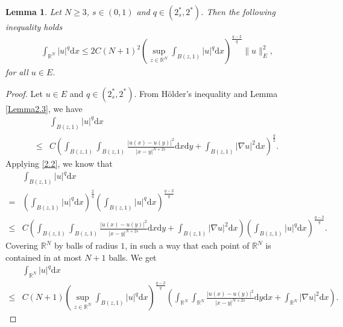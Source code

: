 \documentclass[12pt,a4paper,reqno]{amsart}
\numberwithin{equation}{section}
\newtheorem{lemma}{Lemma}[section]
\begin{document}
\begin{lemma}\label{Lemma2.4}
Let $N\geqslant 3$, $s\in(0,1)$ and $q\in(2^{*}_{s},2^{*})$. Then the following inequality holds
\begin{equation*}
\begin{aligned}
\int_{\mathbb{R}^{N}}|u|^{q}\mathrm{d}x\leqslant2C(N+1)^{2}
\left(\sup_{z\in \mathbb{R}^{N}}
\int_{B(z,1)}
|u|^{q}
\mathrm{d}x\right)^{\frac{q-2}{q}}
\|u\|_{E}^{2},
\end{aligned}
\end{equation*}
for all $u\in E$.
\end{lemma}

\begin{proof}
Let $u\in E$ and $q\in(2_{s}^{*},2^{*})$.
From H\"{o}lder's inequality and Lemma \ref{Lemma2.3}, we have
\begin{equation}\label{2.2}
\begin{aligned}
&\int_{B(z,1)}|u|^{q}\mathrm{d}x\\
\leqslant&
C
\left(
\int_{B(z,1)}\int_{B(z,1)}\frac{|u(x)-u(y)|^{2}}{|x-y|^{N+2s}}\mathrm{d}x\mathrm{d}y
+
\int_{B(z,1)}
|\nabla u|^{2}
\mathrm{d}x\right)^{\frac{q}{2}}.
\end{aligned}
\end{equation}
Applying \eqref{2.2}, we know that
\begin{equation*}
\begin{aligned}
&\int_{B(z,1)}|u|^{q}\mathrm{d}x\\
=&
\left(\int_{B(z,1)}|u|^{q}\mathrm{d}x\right)^{\frac{2}{q}}
\left(\int_{B(z,1)}|u|^{q}\mathrm{d}x\right)
^{\frac{q-2}{q}}\\
\leqslant&
C
\left(
\int_{B(z,1)}\int_{B(z,1)}\frac{|u(x)-u(y)|^{2}}{|x-y|^{N+2s}}\mathrm{d}x\mathrm{d}y
+
\int_{B(z,1)}
|\nabla u|^{2}
\mathrm{d}x\right)
\left(\int_{B(z,1)}|u|^{q}\mathrm{d}x\right)
^{\frac{q-2}{q}}.
\end{aligned}
\end{equation*}
Covering $\mathbb{R}^{N}$ by balls of radius $1$,
in such a way that each point of $\mathbb{R}^{N}$ is contained in at most $N+1$ balls.
We get
\begin{equation*}
\begin{aligned}
&\int_{\mathbb{R}^{N}}|u|^{q}\mathrm{d}x\\
\leqslant& C(N+1)
\left(\sup_{z\in \mathbb{R}^{N}}
\int_{B(z,1)}
|u|^{q}
\mathrm{d}x\right)^{\frac{q-2}{q}}
\left(
\int_{\mathbb{R}^{N}}\int_{\mathbb{R}^{N}}\frac{|u(x)-u(y)|^{2}}{|x-y|^{N+2s}}\mathrm{d}y\mathrm{d}x
+
\int_{\mathbb{R}^{N}}
|\nabla u|^{2}
\mathrm{d}x\right).
\end{aligned}
\end{equation*}
\end{proof}
\end{document}
